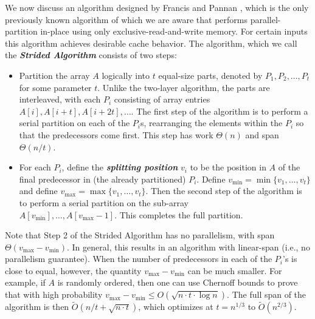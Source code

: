 \documentclass[sigconf]{acmart}
\newcommand{\defn}[1]       {{\textit{\textbf{\boldmath #1}}}}
\renewcommand{\paragraph}[1]{\vspace{0.09in}\noindent{\bf \boldmath #1.}}
\theoremstyle{remark}
\theoremstyle{remark}
\begin{document}
\paragraph{A Cache-Efficient Algorithm}
We now discuss an algorithm designed by Francis and Pannan \cite{FrancisPa92}, which is the only previously known algorithm of which we are aware that performs parallel-partition in-place using only exclusive-read-and-write memory. 
For certain inputs this algorithm achieves desirable cache behavior. 
The algorithm, which we call the \defn{Strided Algorithm} consists of two steps: 
\begin{itemize}
\item Partition the array $A$ logically into $t$ equal-size parts, denoted by
  $P_1, P_2, \ldots, P_t$ for some parameter $t$. Unlike the two-layer
  algorithm, the parts are interleaved, with each $P_i$ consisting of
  array entries $A[i], A[i + t], A[i + 2t], \ldots$. The first step of
  the algorithm is to perform a serial partition on each of the
  $P_i$s, rearranging the elements within the $P_i$ so that the
  predecessors come first. This step has work $\Theta(n)$ and span
  $\Theta(n/t)$.
\item For each $P_i$, define the \defn{splitting position} $v_i$ to be
  the position in $A$ of the final predecessor in (the already
  partitioned) $P_i$. Define $v_{\text{min}} = \min\{v_1, \ldots,
  v_t\}$ and define $v_{\text{max}} = \max\{v_1, \ldots, v_t\}$. Then the
  second step of the algorithm is to perform a serial partition on the
  sub-array \\$A[v_{\text{min}}],\ldots, A[v_{\text{max}}-1]$. This completes the   
    full partition.
\end{itemize}

Note that Step 2 of the Strided Algorithm has no parallelism, with span $\Theta(v_{\text{max}} - v_{\text{min}})$. 
In general, this results in an algorithm with linear-span (i.e., no parallelism guarantee).
When the number of predecessors in each of the $P_i$'s is close to equal, however, the quantity $v_{\text{max}} - v_{\text{min}}$ can be much smaller. 
For example, if $A$ is randomly ordered, then one can use Chernoff bounds to prove that with high probability $v_{\text{max}} - v_{\text{min}} \le O(\sqrt{n \cdot t
  \cdot \log n})$.
The full span of the algorithm is then $\tilde{O}(n/t + \sqrt{n \cdot t})$, which optimizes at $t = n^{1/3}$ to $\tilde{O}(n^{2/3})$.
\end{document}
